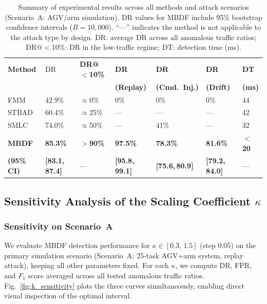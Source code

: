 \documentclass[manuscript,screen,review]{acmart}
\begin{document}
\begin{table}[!t]
\renewcommand{\arraystretch}{1.35}
\caption{Summary of experimental results across all methods
and attack scenarios (Scenario~A: AGV/arm simulation).
DR values for MBDF include 95\% bootstrap confidence
intervals ($B = 10{,}000$). ``---'' indicates the method
is not applicable to the attack type by design.
$\overline{\mathrm{DR}}$: average DR across all anomalous
traffic ratios; DR@$<$10\%: DR in the low-traffic regime;
DT: detection time (ms).}
\label{tab:summary}
\centering
\small
\begin{tabular}{lllllll}
\toprule
\textbf{Method} &
$\overline{\mathrm{DR}}$ &
\textbf{DR@$<$10\%} &
\textbf{DR} &
\textbf{DR} &
\textbf{DR} &
\textbf{DT} \\
& & &
\textbf{(Replay)} &
\textbf{(Cmd.\ Inj.)} &
\textbf{(Drift)} &
\textbf{(ms)} \\
\midrule
FMM   & 42.9\% & $\approx$0\%  & 0\%   & 0\%   & 0\%   & 44 \\
STBAD & 60.4\% & $\approx$25\% & ---   & ---   & ---   & 42 \\
SMLC  & 74.0\% & $\approx$50\% & ---   & 41\%  & ---   & 32 \\
\midrule
\textbf{MBDF} &
  \textbf{85.3\%} &
  \textbf{$>$90\%} &
  \textbf{97.5\%} &
  \textbf{78.3\%} &
  \textbf{81.6\%} &
  \textbf{$<$20} \\
\textbf{(95\% CI)} &
  \textbf{[83.1,\,87.4]} & --- &
  \textbf{[95.8,\,99.1]} &
  \textbf{[75.6,\,80.9]} &
  \textbf{[79.2,\,84.0]} & --- \\
\bottomrule
\end{tabular}
\end{table}

\subsection{Sensitivity Analysis of the Scaling
Coefficient $\kappa$}
\label{sec:sensitivity}

\subsubsection{Sensitivity on Scenario~A}
\label{sec:kappa_scenA}

We evaluate MBDF detection performance for
$\kappa \in [0.3,\,1.5]$ (step $0.05$) on the primary
simulation scenario (Scenario~A: 25-task AGV+arm system,
replay attack), keeping all other parameters fixed.
For each $\kappa$, we compute DR, FPR, and $F_1$ score
averaged across all tested anomalous traffic ratios.
Fig.~\ref{fig:k_sensitivity} plots the three curves
simultaneously, enabling direct visual inspection of the
optimal interval.
\end{document}
